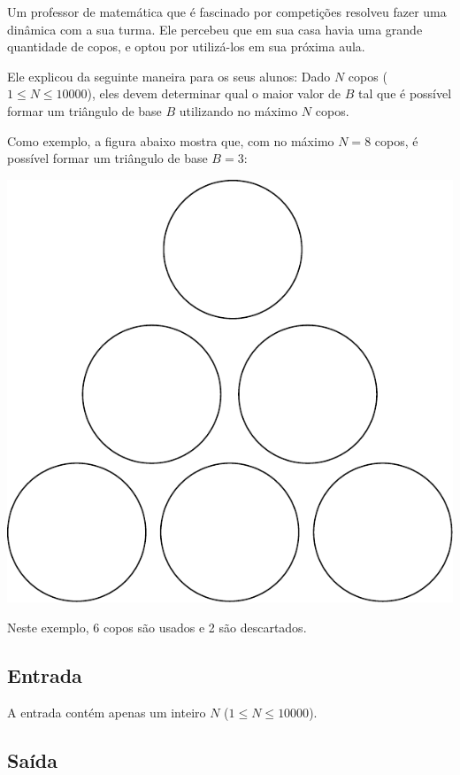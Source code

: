 Um professor de matemática que é fascinado por competições resolveu fazer uma
dinâmica com a sua turma. Ele percebeu que em sua casa havia uma grande
quantidade de copos, e optou por utilizá-los em sua próxima aula.

Ele explicou da
seguinte maneira para os seus alunos: Dado $N$ copos ($1 \leq N \leq 10000$), eles
devem determinar qual o maior valor de $B$ tal que é possível formar um
triângulo de base $B$ utilizando no máximo $N$ copos.

Como exemplo, a figura abaixo mostra que, com no máximo $N=8$ copos, é possível formar um
triângulo de base $B=3$:

\begin{center}
    \includegraphics[scale=0.2]{empilha/empilha.pdf}
\end{center}

Neste exemplo, 6 copos são usados e 2 são descartados.

\subsection*{Entrada}

A entrada contém apenas um inteiro $N$ ($1 \leq N \leq 10000$).

\subsection*{Saída}

